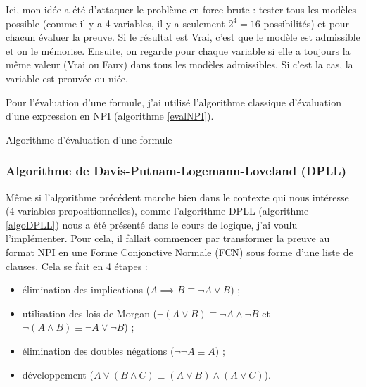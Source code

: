 \documentclass[12pt, algo]{cours}
\begin{document}
Ici, mon idée a été d'attaquer le problème en force brute : tester tous les modèles possible (comme il y a 4 variables, il y a seulement $2^4=16$ possibilités) et pour chacun évaluer la preuve. Si le résultat est Vrai, c'est que le modèle est admissible et on le mémorise. Ensuite, on regarde pour chaque variable si elle a toujours la même valeur (Vrai ou Faux) dans tous les modèles admissibles. Si c'est la cas, la variable est prouvée ou niée.

Pour l'évaluation d'une formule, j'ai utilisé l'algorithme classique d'évaluation d'une expression en NPI (algorithme \ref{evalNPI}).

\begin{algorithm}[h]
\caption{Algorithme d'évaluation d'une formule}
\label{evalNPI}
\end{algorithm}

\subsubsection{Algorithme de Davis-Putnam-Logemann-Loveland (DPLL)}

Même si l'algorithme précédent marche bien dans le contexte qui nous intéresse (4 variables propositionnelles), comme l'algorithme DPLL (algorithme \ref{algoDPLL}) nous a été présenté dans le cours de logique, j'ai voulu l'implémenter. Pour cela, il fallait commencer par transformer la preuve au format NPI en une Forme Conjonctive Normale (FCN) sous forme d'une liste de clauses. Cela se fait en 4 étapes :
\begin{itemize}
\item élimination des implications ($A \implies B \equiv \neg A \vee B$) ;
\item utilisation des lois de Morgan ($\neg (A \vee B) \equiv \neg A \wedge \neg B$ et $\neg (A \wedge B) \equiv \neg A \vee \neg B$) ;
\item élimination des doubles négations ($\neg \neg A \equiv A$) ;
\item développement ($A \vee (B \wedge C) \equiv (A \vee B) \wedge (A \vee C)$).
\end{itemize}
\end{document}
